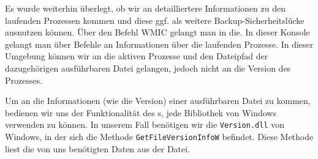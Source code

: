 Es wurde weiterhin überlegt, ob wir an detailliertere Informationen zu
den laufenden Prozessen kommen und diese ggf. als weitere
Backup-Sicherheitslücke ausnutzen können. Über den Befehl WMIC gelangt
man in die. In dieser Konsole gelangt man über Befehle an
Informationen über die laufenden Prozesse.  In dieser
Umgebung können wir \zB an die aktiven Prozesse und den Dateipfad der
dazugehörigen ausführbaren Datei gelangen, jedoch nicht an die Version des
Prozesses.

Um an die Informationen (wie \zB die Version) einer ausführbaren Datei
zu kommen, bedienen wir uns der Funktionalität des s, jede
Bibliothek von Windows verwenden zu können. In unserem Fall benötigen
wir die \texttt{Version.dll} von Windows, in der sich die Methode
\texttt{GetFileVersionInfoW} befindet.  Diese Methode liest die von
uns benötigten Daten aus der Datei.

